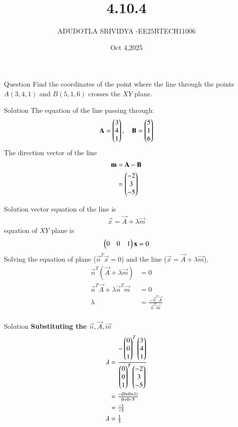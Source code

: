 \documentclass{beamer}
\begin{document}
\title 
{4.10.4}
\date{Oct 4,2025}


\author 
{ADUDOTLA SRIVIDYA -EE25BTECH11006}






\frame{\titlepage}

\begin{frame}{Question}
Find the coordinates of the point where the line through the points $A(3,4,1)$ and $B(5,1,6)$ crosses the $XY$ plane.
\end{frame}

\begin{frame}{Solution}
    The equation of the line passing through:
\begin{align}
    \mathbf{A} = \begin{pmatrix} 3 \\ 4 \\ 1\end{pmatrix}, \quad
    \mathbf{B} = \begin{pmatrix}5 \\ 1 \\ 6\end{pmatrix}
\end{align}
The direction vector of the line 
\begin{align}
    \mathbf{m} &= \mathbf{A} - \mathbf{B} \\
    &= \begin{pmatrix}-2 \\ 3 \\ -5\end{pmatrix}
\end{align}
\end{frame}

\begin{frame}{Solution}
    vector equation of the line is
\begin{align}
    \vec{x} = \vec{A}+\lambda\vec{m}
\end{align}
equation of $XY$ plane is
\begin{align}
    \begin{pmatrix}0 & 0 & 1\end{pmatrix}\mathbf{x} = 0
\end{align}
Solving the equation of plane ($\vec{n}^{T}\vec{x}=0$) and the line ($\vec{x}=\vec{A}+\lambda\vec{m}$),
\begin{align}
    \vec{n}^{T}(\vec{A}+\lambda\vec{m})&=0\\
\vec{n}^{T}\vec{A}+\lambda\vec{n}^{T}\vec{m}&=0\\
\lambda&=\tfrac{-\vec{n}^{T}\vec{A}}{\vec{n}^{T}\vec{m}}\\
\end{align}
\end{frame}

\begin{frame}{Solution}
    \textbf{Substituting the $\vec{n},\vec{A},\vec{m}$}
\begin{align}
\lambda&=\dfrac{-\begin{pmatrix}0\\0 \\1\end{pmatrix}^{T}\begin{pmatrix}3\\4\\1\end{pmatrix}}{\begin{pmatrix}0\\0 \\1\end{pmatrix}^{T}\begin{pmatrix}-2\\3\\-5\end{pmatrix}}\\
&=\tfrac{-(0+0+1)}{0+0-5}\\
&=\tfrac{-1}{-5}\\
\lambda&=\tfrac{1}{5}
\end{align}
\end{frame}
\end{document}
